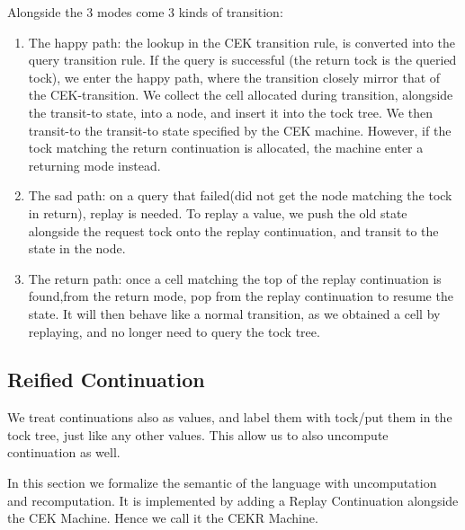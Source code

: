 Alongside the 3 modes come 3 kinds of transition:
\begin{enumerate}
	\item The happy path: the lookup in the CEK transition rule, is converted into the query transition rule. If the query is successful (the return tock is the queried tock), we enter the happy path, where the transition closely mirror that of the CEK-transition. We collect the cell allocated during transition, alongside the transit-to state, into a node, and insert it into the tock tree. We then transit-to the transit-to state specified by the CEK machine. However, if the tock matching the return continuation is allocated, the machine enter a returning mode instead.
	\item The sad path: on a query that failed(did not get the node matching the tock in return), replay is needed. To replay a value, we push the old state alongside the request tock onto the replay continuation, and transit to the state in the node.
	\item The return path: once a cell matching the top of the replay continuation is found,from the return mode, pop from the replay continuation to resume the state. It will then behave like a normal transition, as we obtained a cell by replaying, and no longer need to query the tock tree. 
\end{enumerate}

\subsection{Reified Continuation}
We treat continuations also as values, and label them with tock/put them in the tock tree, just like any other values. This allow us to also uncompute continuation as well.

In this section we formalize the semantic of the language with uncomputation and recomputation. It is implemented by adding a Replay Continuation alongside the CEK Machine.
Hence we call it the CEKR Machine.

